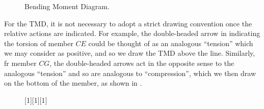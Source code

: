 \documentclass[a4paper,11pt]{article}
\begin{document}
\begin{hidden}
\begin{figure}[ht]
\begin{pysub}
\begin{adjustbox}{max width=\textwidth}
		\end{adjustbox}
	\end{pysub}
	\caption{Bending Moment Diagram.}
	\label{fig:bmd}
\end{figure}

For the TMD, it is not necessary to adopt a strict drawing convention once the relative actions are indicated. For example, the double-headed arrow in  indicating the torsion of member $CE$ could be thought of as an analogous ``tension'' which we may consider as positive, and so we draw the TMD above the line. Similarly, fr member $CG$, the double-headed arrows act in the opposite sense to the analogous ``tension'' and so are analogous to ``compression'', which we then draw on the bottom of the member, as shown in .

\begin{figure}[ht]
	\centering
	
	\begin{pysub}
		[1] 
		\begin{adjustbox}{max width=\textwidth}
\end{adjustbox}
\end{pysub}
\end{figure}
\end{hidden}
\end{document}
